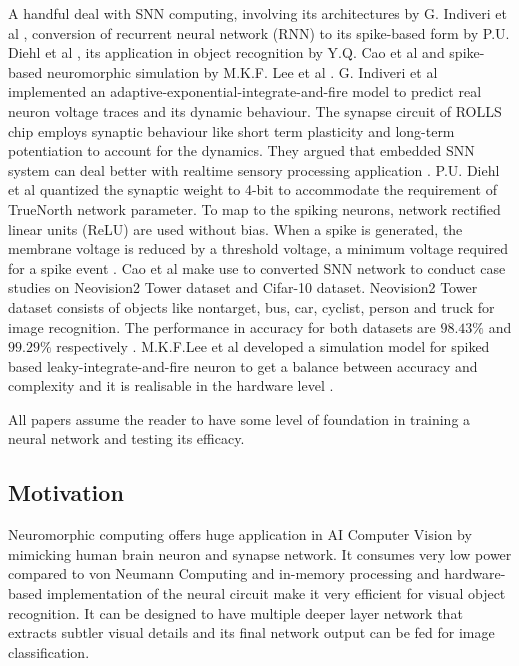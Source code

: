 A handful deal with SNN computing, involving its architectures by G. Indiveri et al \cite{indiveri}, conversion of recurrent neural network (RNN) to its spike-based form by P.U. Diehl et al \cite{diehl}, its application in object recognition by Y.Q. Cao et al \cite{cao} and spike-based neuromorphic simulation by M.K.F. Lee et al \cite{lee}. G. Indiveri et al implemented an adaptive-exponential-integrate-and-fire model to predict real neuron voltage traces and its dynamic behaviour. The synapse circuit of ROLLS chip employs synaptic behaviour like short term plasticity and long-term potentiation to account for the dynamics. They argued that embedded SNN system can deal better with realtime sensory processing application \cite{indiveri}. P.U. Diehl et al quantized the synaptic weight to 4-bit to accommodate the requirement of TrueNorth network parameter. To map to the spiking neurons, network rectified linear units (ReLU) are used without bias. When a spike is generated, the membrane voltage is reduced by a threshold voltage, a minimum voltage required for a spike event \cite{diehl}. Cao et al make use to converted SNN network to conduct case studies on Neovision2 Tower dataset and Cifar-10 dataset.  Neovision2 Tower dataset consists of objects like nontarget, bus, car, cyclist, person and truck for image recognition. The performance in accuracy for both datasets are $98.43\%$ and $99.29\%$ respectively \cite{cao}. M.K.F.Lee et al developed a simulation model for spiked based leaky-integrate-and-fire neuron to get a balance between accuracy and complexity and it is realisable in the hardware level \cite{lee}.

All papers assume the reader to have some level of foundation in training a neural network and testing its efficacy.
\subsection{Motivation}
Neuromorphic computing offers huge application in AI Computer Vision by mimicking human brain neuron and synapse network. It consumes very low power compared to von Neumann Computing and in-memory processing and hardware-based implementation of the neural circuit make it very efficient for visual object recognition. It can be designed to have multiple deeper layer network that extracts subtler visual details and its final network output can be fed for image classification.

